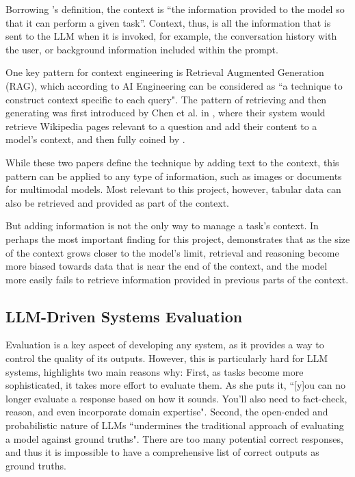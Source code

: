\documentclass[a4paper]{report}
\begin{document}
Borrowing \cite{aiebook2025}'s definition, the context is ``the information provided to the model so that it can perform a given task''. Context, thus, is all the information that is sent to the LLM when it is invoked, for example, the conversation history with the user, or background information included within the prompt.

One key pattern for context engineering is Retrieval Augmented Generation (RAG), which according to AI Engineering can be considered as ``a technique to construct context specific to each query". The pattern of retrieving and then generating was first introduced by Chen et al. in \cite{chen2017readingwikipediaansweropendomain}, where their system would retrieve Wikipedia pages relevant to a question and add their content to a model's context, and then fully coined by \cite{lewis2021retrievalaugmentedgeneration}.

While these two papers define the technique by adding text to the context, this pattern can be applied to any type of information, such as images or documents for multimodal models. Most relevant to this project, however, tabular data can also be retrieved and provided as part of the context.

But adding information is not the only way to manage a task's context. In perhaps the most important finding for this project, \cite{veseli2025positionalbiasesshiftinputs} demonstrates that as the size of the context grows closer to the model's limit, retrieval and reasoning become more biased towards data that is near the end of the context, and the model more easily fails to retrieve information provided in previous parts of the context.

\subsection{LLM-Driven Systems Evaluation}
\label{sec:llm-evaluation}

Evaluation is a key aspect of developing any system, as it provides a way to control the quality of its outputs. However, this is particularly hard for LLM systems, \cite{aiebook2025} highlights two main reasons why: First, as tasks become more sophisticated, it takes more effort to evaluate them. As she puts it, ``[y]ou can  no longer evaluate a response based on how it sounds. You'll also need to fact-check, reason, and even incorporate domain expertise".  Second, the open-ended and probabilistic nature of LLMs ``undermines the traditional approach of evaluating a model against ground truths". There are too many potential correct responses, and thus it is impossible to have a comprehensive list of correct outputs as ground truths.
\end{document}

